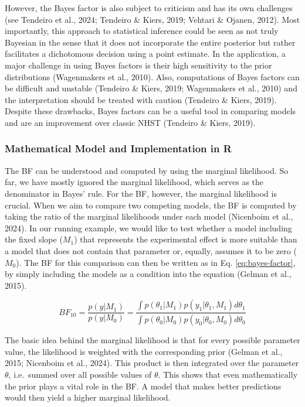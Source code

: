 \documentclass[
  doc,12pt,floatsintext]{apa7}
\begin{document}
However, the Bayes factor is also subject to criticism and has its own challenges (see Tendeiro et al., 2024; Tendeiro \& Kiers, 2019; Vehtari \& Ojanen, 2012). Most importantly, this approach to statistical inference could be seen as not truly Bayesian in the sense that it does not incorporate the entire posterior but rather facilitates a dichotomous decision using a point estimate. In the application, a major challenge in using Bayes factors is their high sensitivity to the prior distributions (Wagenmakers et al., 2010). Also, computations of Bayes factors can be difficult and unstable (Tendeiro \& Kiers, 2019; Wagenmakers et al., 2010) and the interpretation should be treated with caution (Tendeiro \& Kiers, 2019). Despite these drawbacks, Bayes factors can be a useful tool in comparing models and are an improvement over classic NHST (Tendeiro \& Kiers, 2019).

\subsubsection{Mathematical Model and Implementation in R}\label{mathematical-model-and-implementation-in-r-2}

The BF can be understood and computed by using the marginal likelihood. So far, we have mostly ignored the marginal likelihood, which serves as the denominator in Bayes' rule. For the BF, however, the marginal likelihood is crucial. When we aim to compare two competing models, the BF is computed by taking the ratio of the marginal likelihoods under each model (Nicenboim et al., 2024). In our running example, we would like to test whether a model including the fixed slope (\(M_1\)) that represents the experimental effect is more suitable than a model that does not contain that parameter or, equally, assumes it to be zero (\(M_0\)). The BF for this comparison can then be written as in Eq. \eqref{eq:bayes-factor}, by simply including the models as a condition into the equation (Gelman et al., 2015).

\begin{equation}
BF_{10} = \frac{p(y|M_1)}{p(y|M_0)} = \frac{\int{p(\theta_1|M_1)p(y_1|\theta_1,M_1)}d\theta_1}{\int{p(\theta_0|M_0)p(y_0|\theta_0,M_0)}d\theta_0}
\label{eq:bayes-factor}
\end{equation}

The basic idea behind the marginal likelihood is that for every possible parameter value, the likelihood is weighted with the corresponding prior (Gelman et al., 2015; Nicenboim et al., 2024). This product is then integrated over the parameter \(\theta\), i.e.~summed over all possible values of \(\theta\). This shows that even mathematically the prior plays a vital role in the BF. A model that makes better predictions would then yield a higher marginal likelihood.
\end{document}
